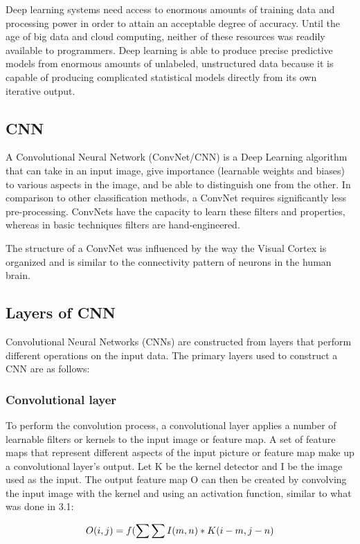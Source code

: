 Deep learning systems need access to enormous amounts of training data and processing power in order to attain an acceptable degree of accuracy. Until the age of big data and cloud computing, neither of these resources was readily available to programmers. Deep learning is able to produce precise predictive models from enormous amounts of unlabeled, unstructured data because it is capable of producing complicated statistical models directly from its own iterative output. 

\subsection{CNN}
A Convolutional Neural Network (ConvNet/CNN) is a Deep Learning algorithm that can take in an input image, give importance (learnable weights and biases) to various aspects in the image, and be able to distinguish one from the other. In comparison to other classification methods, a ConvNet requires significantly less pre-processing. ConvNets have the capacity to learn these filters and properties, whereas in basic techniques filters are hand-engineered.

The structure of a ConvNet was influenced by the way the Visual Cortex is organized and is similar to the connectivity pattern of neurons in the human brain.

\subsection{Layers of CNN}
Convolutional Neural Networks (CNNs) are constructed from layers that perform different operations on the input data. The primary layers used to construct a CNN are as follows:

\subsubsection{Convolutional layer}
To perform the convolution process, a convolutional layer applies a number of learnable filters or kernels to the input image or feature map. A set of feature maps that represent different aspects of the input picture or feature map make up a convolutional layer's output. Let K be the kernel detector and I be the image used as the input. The output feature map O can then be created by convolving the input image with the kernel and using an activation function, similar to what was done in 3.1:

\begin{equation}
\label{eq:cnn_conv_layer}
    \textcolor{black}{O(i,j) = f(\sum\sum I(m,n) * K(i-m,j-n)}
\end{equation}

